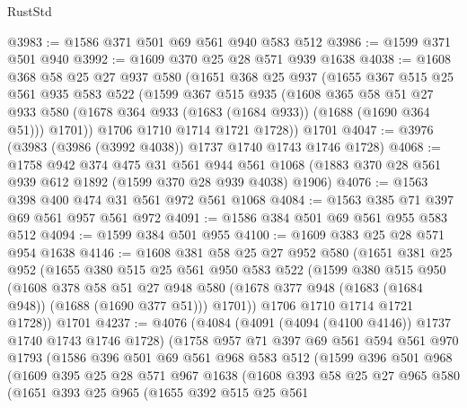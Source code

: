 \begin{lexlean}{RustStd}
\begin{coremodule}
@3983 := @1586 @371 @501 @69 @561 @940 @583 @512
@3986 := @1599 @371 @501 @940
@3992 := @1609 @370 @25 @28 @571 @939 @1638
@4038 := @1608
    @368
    @58
    @25
    @27
    @937
    @580
    (@1651
      @368
      @25
      @937
      (@1655
        @367
        @515
        @25
        @561
        @935
        @583
        @522
        (@1599
          @367
          @515
          @935
          (@1608
            @365
            @58
            @51
            @27
            @933
            @580
            (@1678 @364 @933 (@1683 (@1684 @933)) (@1688 (@1690 @364 @51)))
            @1701))
        @1706
        @1710
        @1714
        @1721
        @1728))
    @1701
@4047 := @3976 (@3983 (@3986 (@3992 @4038)) @1737 @1740 @1743 @1746 @1728)
@4068 := @1758
    @942
    @374
    @475
    @31
    @561
    @944
    @561
    @1068
    (@1883 @370 @28 @561 @939 @612 @1892 (@1599 @370 @28 @939 @4038) @1906)
@4076 := @1563 @398 @400 @474 @31 @561 @972 @561 @1068
@4084 := @1563 @385 @71 @397 @69 @561 @957 @561 @972
@4091 := @1586 @384 @501 @69 @561 @955 @583 @512
@4094 := @1599 @384 @501 @955
@4100 := @1609 @383 @25 @28 @571 @954 @1638
@4146 := @1608
    @381
    @58
    @25
    @27
    @952
    @580
    (@1651
      @381
      @25
      @952
      (@1655
        @380
        @515
        @25
        @561
        @950
        @583
        @522
        (@1599
          @380
          @515
          @950
          (@1608
            @378
            @58
            @51
            @27
            @948
            @580
            (@1678 @377 @948 (@1683 (@1684 @948)) (@1688 (@1690 @377 @51)))
            @1701))
        @1706
        @1710
        @1714
        @1721
        @1728))
    @1701
@4237 := @4076
    (@4084
      (@4091 (@4094 (@4100 @4146)) @1737 @1740 @1743 @1746 @1728)
      (@1758
        @957
        @71
        @397
        @69
        @561
        @594
        @561
        @970
        @1793
        (@1586
          @396
          @501
          @69
          @561
          @968
          @583
          @512
          (@1599
            @396
            @501
            @968
            (@1609
              @395
              @25
              @28
              @571
              @967
              @1638
              (@1608
                @393
                @58
                @25
                @27
                @965
                @580
                (@1651
                  @393
                  @25
                  @965
                  (@1655
                    @392
                    @515
                    @25
                    @561

\end{coremodule}
\end{lexlean}
